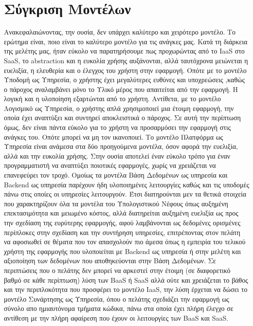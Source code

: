 \documentclass{article}
\begin{document}
\section{Σύγκριση Μοντέλων}
Ανακεφαλαιώνοντας, την ουσία, δεν υπάρχει καλύτερο και χειρότερο μοντέλο. Το ερώτημα είναι, ποιο είναι το καλύτερο μοντέλο για τις ανάγκες μας. Κατά τη διάρκεια της μελέτης μας, ήταν εύκολο να παρατηρήσουμε πως προχωρώντας από το IaaS στο SaaS, το abstraction και η ευκολία χρήσης αυξάνονται, αλλά ταυτόχρονα μειώνεται η ευελιξία, η ελευθερία και ο έλεγχος του χρήστη στην εφαρμογή. Οπότε με το μοντέλο Υποδομή ως Υπηρεσία, ο χρήστης έχει μεγαλύτερες ευθύνες και υποχρεώσεις ,καθώς ο πάροχος αναλαμβάνει μόνο το Υλικό μέρος που απαιτείται από την εφαρμογή. Η λογική και η υλοποίηση εξαρτώνται από το χρήστη. Αντίθετα, με το μοντέλο Λογισμικό ως Υπηρεσία, ο χρήστης απλά χρησιμοποιεί μια έτοιμη εφαρμογή, την οποία έχει αναπτύξει και συντηρεί αποκλειστικά ο πάροχος. Σε αυτή την περίπτωση όμως, δεν είναι πάντα εύκολο για το χρήστη να προσαρμόσει την εφαρμογή στις ανάγκες του. Οπότε μπορεί να μη τον ικανοποιεί. Το μοντέλο Πλατφόρμα ως Υπηρεσία είναι ανάμεσα στα δύο προηγούμενα μοντέλα, όσον αφορά την ευελιξία, αλλά και την ευκολία χρήσης. Στην ουσία αποτελεί έναν εύκολο τρόπο για έναν προγραμματιστή να αναπτύξει ποιοτικές εφαρμογές, χωρίς να χρειάζεται να επανεφεύρει τον τροχό. Ομοίως τα μοντέλα Βάση Δεδομένων ως υπηρεσία και Backend ως υπηρεσία παρέχουν ήδη υλοποιημένες λειτουργίες καθώς και τις υποδομές πάνω στις οποίες οι υπηρεσίες λειτουργούν. Έτσι διατηρούνται μεν τα θετικά στοιχεία που χαρακτηρίζουν όλα τα μοντέλα του Υπολογιστικού Νέφους όπως αυξημένη επεκτασιμότητα και μειωμένο κόστος, αλλά διατηρείται αυξημένη ευελιξία ως προς την σχεδίαση της ευρύτερης εφαρμογής, αφού λαμβάνονται ως δεδομένες ορισμένες περίπλοκες στην σχεδίαση και την συντήρηση υπηρεσίες, επιτρέποντας στον πελάτη να αφοσιωθεί σε θέματα που τον απασχολούν πιο άμεσα όπως η εμπειρία του τελικού χρήστη της εφαρμογής που υλοποιείται με Backend ως υπηρεσία ή στην μελέτη και αξιοποίηση των δεδομένων που αποθηκεύονται στην Βάση Δεδομένων. Σε περιπτώσεις που ο πελάτης δεν μπορεί να αρκεστεί στην έτοιμη (σε διαφορετικό βαθμό σε κάθε περίπτωση) λύση των BaaS ή SaaS αλλά ούτε και χρειάζεται το βάθος και την περιπλοκότητα που προσφέρει το μοντέλο IaaS, την λύση έρχεται να δώσει το μοντέλο Συνάρτησης ως Υπηρεσία, όπου ο πελάτης σχεδιάζει την εφαρμογή ως σύνολο απο ημιαυτόνομα τμήματα κώδικα, πάνω στα οποία έχει πλήρη έλεγχο σε αντίθεση με την πλήρη αφαίρεση που έχουν οι λειτουργίες των BaaS και SaaS.
\end{document}
